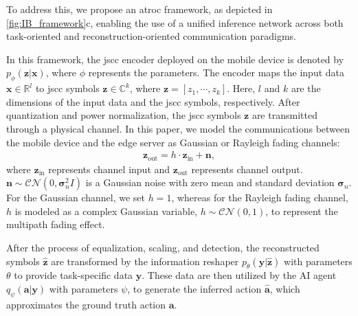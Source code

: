 To address this, we propose an \gls{atroc} framework, as depicted in \cref{fig:IB_framework}c, enabling the use of a unified inference network across both task-oriented and reconstruction-oriented communication paradigms.

In this framework, the \gls{jscc} encoder deployed on the mobile device is denoted by $p_\phi(\bm{z}|\bm{x})$, where $\phi$ represents the parameters. The encoder maps the input data $\bm{x} \in \mathbb{R}^{l}$ to \gls{jscc} symbols $\bm{z} \in \mathbb{C}^{k}$, where $\bm{z}=[z_1, \cdots, z_{k}]$. Here, $l$ and $k$ are the dimensions of the input data and the \gls{jscc} symbols, respectively. After quantization and power normalization, the \gls{jscc} symbols $\bm{z}$ are transmitted through a physical channel. In this paper, we model the communications between the mobile device and the edge server as Gaussian or Rayleigh fading channels:
\begin{align}
    \bm{z}_{\text{out}} = h \cdot \bm{z}_{\text{in}} + \bm{n},
    \label{eq_channel}
\end{align}
where $\bm{z}_{\text{in}}$ represents channel input and $\bm{z}_{\text{out}}$ represents channel output. $\bm{n} \sim \mathcal{CN}(0, \bm{\sigma}_{n}^{2} I)$ is a Gaussian noise with zero mean and standard deviation $\bm{\sigma}_{n}$. For the Gaussian channel, we set $h=1$, whereas for the Rayleigh fading channel, $h$ is modeled as a complex Gaussian variable, $h \sim \mathcal{CN}(0, 1)$, to represent the multipath fading effect.

After the process of equalization, scaling, and detection, the reconstructed symbols $\hat{\bm{z}}$ are transformed by the information reshaper $p_{\theta}(\bm{y}|\hat{\bm{z}})$ with parameters $\theta$ to provide task-specific data $\bm{y}$. These data are then utilized by the AI agent $q_\psi(\bm{a}|\bm{y})$ with parameters $\psi$, to generate the inferred action $\hat{\bm{a}}$, which approximates the ground truth action $\bm{a}$.







